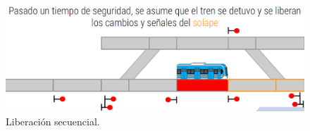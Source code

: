 \lipsum[1]

    \begin{figure}[!h]
        \centering
        \includegraphics[width=1\textwidth]{Figuras/secuencial_4}
        \centering\caption{Liberación secuencial.}
        \label{fig:secuencial_4}
    \end{figure}
    
\lipsum[1]